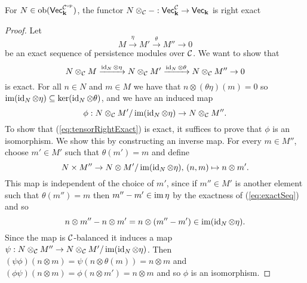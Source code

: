 \begin{lemma}\label{lemma:tensorRightExact}
    For $N\in\operatorname{ob}(\normalfont\mathsf{Vec}_{\mathbf{k}}^{\mathcal{C}^{\text{op}}})$, the functor $N\otimes_{\mathcal{C}} -:\normalfont\mathsf{Vec}_{\mathbf{k}}^{\mathcal{C}}\to\normalfont\mathsf{Vec}_{\mathbf{k}}$ is right exact
\end{lemma}
\begin{proof}
    Let 
    \begin{equation}\label{eq:exactSeq}
        M\xrightarrow{\eta} M'\xrightarrow{\theta} M''\to 0
    \end{equation}
    be an exact sequence of persistence modules over $\mathcal{C}$. 
    We want to show that
    \begin{equation}\label{eq:tensorRightExact}
        N\otimes_{\mathcal{C}} M\xrightarrow{\operatorname{id}_N\otimes\eta}N\otimes_{\mathcal{C}} M'\xrightarrow{\operatorname{id}_N\otimes\theta}N\otimes_{\mathcal{C}} M''\to 0
    \end{equation}
    is exact.
    For all $n\in N$ and $m\in M$ we have that $n\otimes(\theta\eta)(m)=0$ so $\operatorname{im}(\operatorname{id}_N\otimes\eta)\subseteq\ker(\operatorname{id}_N\otimes\theta)$, and we have an induced map
    \[ \phi:N\otimes_{\mathcal{C}} M'/\operatorname{im}(\operatorname{id}_N\otimes\eta)\to N\otimes_{\mathcal{C}} M''. \]
    To show that (\ref{eq:tensorRightExact}) is exact, it suffices to prove that $\phi$ is an isomorphism.
    We show this by constructing an inverse map.
    For every $m\in M''$, choose $m'\in M'$ such that $\theta(m')=m$ and define
    \[ N\times M''\to N\otimes M'/\operatorname{im}(\operatorname{id}_N\otimes\eta),\, (n,m)\mapsto n\otimes m'. \]
    This map is independent of the choice of $m'$, since if $m''\in M'$ is another element such that $\theta(m'')=m$ then $m''-m'\in\operatorname{im}\eta$ by the exactness of (\ref{eq:exactSeq}) and so
    \[ n\otimes m''-n\otimes m'=n\otimes(m''-m')\in\operatorname{im}(\operatorname{id}_N\otimes \eta). \]
    Since the map is $\mathcal{C}$-balanced it induces a map $\psi:N\otimes_{\mathcal{C}} M''\to N\otimes_{\mathcal{C}} M'/\operatorname{im}(\operatorname{id}_N\otimes \eta)$.
    Then $(\psi\phi)(n\otimes m)=\psi(n\otimes\theta(m))=n\otimes m$ and $(\phi\psi)(n\otimes m)=\phi(n\otimes m')=n\otimes m$ and so $\phi$ is an isomorphism.
\end{proof}

